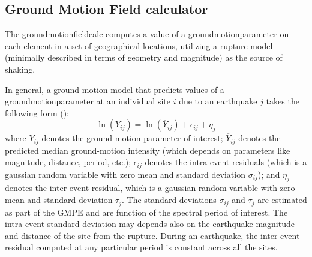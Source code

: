 \subsection{Ground Motion Field calculator}
%
The \gls{groundmotionfieldcalc} computes a value of a 
\gls{groundmotionparameter} on each element in a set of 
geographical locations, utilizing a rupture model (minimally 
described in terms of geometry and magnitude) as the source of 
shaking.

In general, a ground-motion model that predicts values of a 
\gls{groundmotionparameter} at an individual site $i$ due to 
an earthquake $j$ takes the following form (\cite{jayaram2009}):
%
\begin{equation}
\ln (Y_{ij}) = \ln (\overline{Y}_{ij})+\epsilon_{ij}+\eta_{j}
\label{gmfeq}
\end{equation}
%
where $Y_{ij}$ denotes the ground-motion parameter of interest; 
$\overline{Y}_{ij}$ denotes the predicted median ground-motion 
intensity (which depends on parameters like magnitude, distance, 
period, etc.); $\epsilon_{ij}$ denotes the intra-event residuals 
(which is a gaussian random variable with zero mean and standard 
deviation $\sigma_{ij}$); and $\eta_{j}$ denotes the inter-event 
residual, which is a gaussian random variable with zero mean and 
standard deviation $\tau_{j}$. The standard deviations $\sigma_{ij}$ 
and $\tau_{j}$ are estimated as part of the GMPE and are function of 
the spectral period of interest. The intra-event standard deviation 
may depends also on the earthquake magnitude and distance of the 
site from the rupture. During an earthquake, the inter-event residual
computed at any particular period is constant across all the sites.

